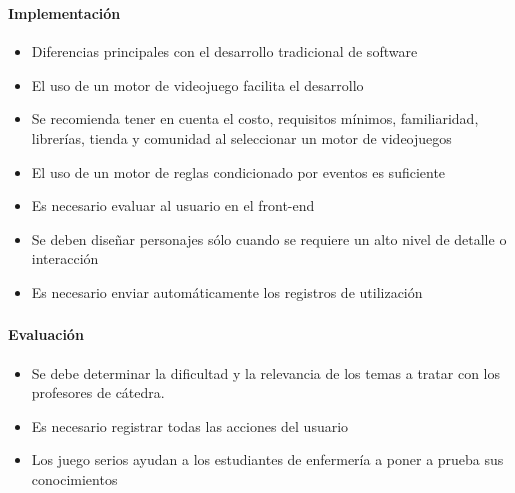 \begin{frame}
\frametitle{\pagetitle}
\framesubtitle{Implementación}
\begin{itemize}[<+->]

\item Diferencias principales con el desarrollo tradicional de software

\item El uso de un motor de videojuego facilita el desarrollo

\item Se recomienda tener en cuenta el costo, requisitos mínimos, familiaridad,
    librerías, tienda y comunidad al seleccionar un motor de videojuegos
    
\item El uso de un motor de reglas condicionado por eventos es suficiente

\item Es necesario evaluar al usuario en el front-end

\item Se deben diseñar personajes sólo cuando se requiere un alto nivel de
    detalle o interacción

\item Es necesario enviar automáticamente los registros de utilización 

\end{itemize}
\end{frame}

\begin{frame}
\frametitle{\pagetitle}
\framesubtitle{Evaluación}
\begin{itemize}[<+->]

\item Se debe determinar la dificultad y la relevancia de los temas a tratar con los
    profesores de cátedra.

\item Es necesario registrar todas las acciones del usuario

\item Los juego serios ayudan a los estudiantes de enfermería a poner a
        prueba sus conocimientos

\end{itemize}
\end{frame}
